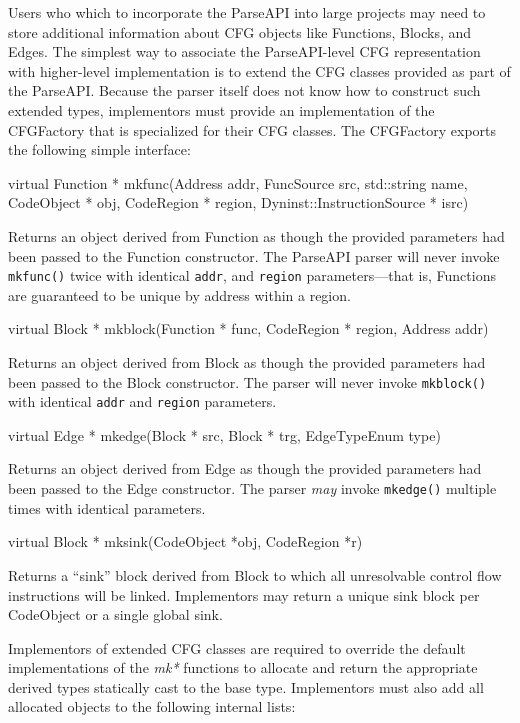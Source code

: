 \documentclass{article}
\newenvironment{apient}{\small\verbatim}{\endverbatim}
\newcommand{\apidesc}[1]{%
{\addtolength{\leftskip}{4em}%
#1\par\medskip}
}
\begin{document}
Users who which to incorporate the ParseAPI into large projects may need to store additional information about CFG objects like Functions, Blocks, and Edges. The simplest way to associate the ParseAPI-level CFG representation with higher-level implementation is to extend the CFG classes provided as part of the ParseAPI. Because the parser itself does not know how to construct such extended types, implementors must provide an implementation of the CFGFactory that is specialized for their CFG classes. The CFGFactory exports the following simple interface:

\begin{apient}
virtual Function * mkfunc(Address addr, 
    FuncSource src,
    std::string name, 
    CodeObject * obj, 
    CodeRegion * region,
    Dyninst::InstructionSource * isrc)
\end{apient}
\apidesc{Returns an object derived from Function as though the provided parameters had been passed to the Function constructor. The ParseAPI parser will never invoke \texttt{mkfunc()} twice with identical \texttt{addr}, and \texttt{region} parameters---that is, Functions are guaranteed to be unique by address within a region.}

\begin{apient}
virtual Block * mkblock(Function * func, CodeRegion * region, Address addr)
\end{apient}
\apidesc{Returns an object derived from Block as though the provided parameters had been passed to the Block constructor. The parser will never invoke \texttt{mkblock()} with identical \texttt{addr} and \texttt{region} parameters.}

\begin{apient}
virtual Edge * mkedge(Block * src, Block * trg, EdgeTypeEnum type)
\end{apient}
\apidesc{Returns an object derived from Edge as though the provided parameters had been passed to the Edge constructor. The parser \emph{may} invoke \texttt{mkedge()} multiple times with identical parameters.}

\begin{apient}
virtual Block * mksink(CodeObject *obj, CodeRegion *r)
\end{apient}
\apidesc{Returns a ``sink'' block derived from Block to which all unresolvable control flow instructions will be linked. Implementors may return a unique sink block per CodeObject or a single global sink.}

Implementors of extended CFG classes are required to override the default implementations of the \emph{mk*} functions to allocate and return the appropriate derived types statically cast to the base type. Implementors must also add all allocated objects to the following internal lists:
\end{document}
